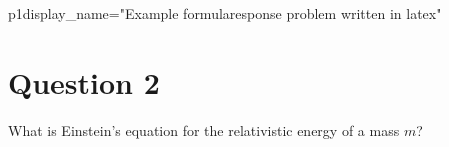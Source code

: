\documentclass[12pt]{article}
\begin{document}
\begin{edXproblem}{p1}{display_name="Example formularesponse problem written in latex"}

\section{Question 2}

What is Einstein's equation for the relativistic energy of a mass $m$?


%



\end{edXproblem}

\end{document}
